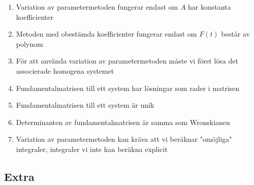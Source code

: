 \begin{enumerate}
  \item Variation av parametermetoden fungerar endast om $A$ har konstanta koefficienter
  \item Metoden med obestämda koefficienter fungerar endast om $F(t)$ består av polynom
  \item För att använda variation av parametermetoden måste vi först lösa det associerade homogena systemet
  \item Fundamentalmatrisen till ett system har lösningar som rader i matrisen
  \item Fundamentalmatrisen till ett system är unik
  \item Determinanten av fundamentalmatrisen är samma som Wronskianen
  \item Variation av parametermetoden kan kräva att vi beräknar "omöjliga" integraler, integraler vi inte kan beräkna explicit
\end{enumerate}

\par\bigskip
\subsection{Extra}\hfill\\
\par\bigskip

